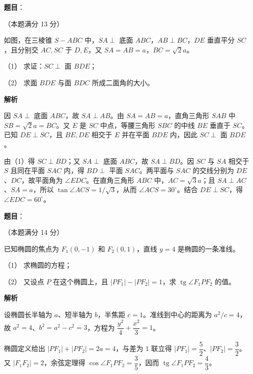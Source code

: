 \begin{answer}

\textbf{题目}：

（本题满分 13 分）

如图，在三棱锥 $S-ABC$ 中，$SA\perp$ 底面 $ABC$，$AB\perp BC$，$DE$ 垂直平分 $SC$，且分别交 $AC,SC$ 于 $D,E$，又 $SA=AB=a$，$BC=\sqrt2a$。

（1） 求证：$SC\perp$ 面 $BDE$；

（2） 求面 $BDE$ 与面 $BDC$ 所成二面角的大小。
\nopagebreak[4]
\begin{center}\end{center}
\nopagebreak[4]
\textbf{解析}


因 $SA\perp$ 底面 $ABC$，故 $SA\perp AB$。由 $SA=AB=a$，直角三角形 $SAB$ 中 $SB=\sqrt2a=BC$。又 $E$ 是 $SC$ 中点，等腰三角形 $SBC$ 的中线 $BE$ 垂直于 $SC$。已知 $DE\perp SC$，且 $BE,DE$ 相交于 $E$ 并在平面 $BDE$ 内，因此 $SC\perp$ 面 $BDE$。


由（1）得 $SC\perp BD$；又 $SA\perp$ 底面 $ABC$，故 $SA\perp BD$。因 $SC$ 与 $SA$ 相交于 $S$ 且同在平面 $SAC$ 内，得 $BD\perp$ 平面 $SAC$。两平面与 $SAC$ 的交线分别为 $DE$、$DC$，故平面角为 $\angle EDC$。在直角三角形 $ABC$ 中，$AC=\sqrt3a$；且 $SA\perp AC$、$SA=a$，所以 $\tan\angle ACS=1/\sqrt3$，从而 $\angle ACS=30^\circ$。结合 $DE\perp SC$，得 $\angle EDC=60^\circ$。



\end{answer}
\begin{answer}

\textbf{题目}：

（本题满分 14 分）

已知椭圆的焦点为 $F_1(0,-1)$ 和 $F_2(0,1)$，直线 $y=4$ 是椭圆的一条准线。

（1） 求椭圆的方程；

（2） 又设点 $P$ 在这个椭圆上，且 $|PF_1|-|PF_2|=1$，求 $\operatorname{tg}\angle F_1PF_2$ 的值。

\textbf{解析}


设椭圆长半轴为 $a$、短半轴为 $b$，半焦距 $c=1$。准线到中心的距离为 $a^2/c=4$，故 $a^2=4$、$b^2=a^2-c^2=3$，方程为 $\dfrac{y^2}{4}+\dfrac{x^2}{3}=1$。


椭圆定义给出 $|PF_1|+|PF_2|=2a=4$，与差为 $1$ 联立得 $|PF_1|=\dfrac52$、$|PF_2|=\dfrac32$。又 $|F_1F_2|=2$，余弦定理得 $\cos\angle F_1PF_2=\dfrac35$，因而 $\operatorname{tg}\angle F_1PF_2=\dfrac43$。



\end{answer}
